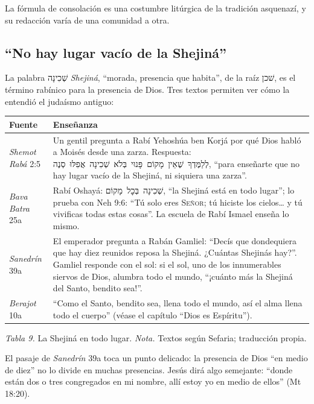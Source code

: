 \documentclass[11pt,letterpaper]{article}
\newcommand{\heb}[1]{\mbox{\foreignlanguage{hebrew}{#1}}}
\newcommand{\SENOR}{\textsc{Señor}}
\begin{document}
\begin{nota}[Precisión]
La fórmula de consolación es una costumbre litúrgica de la tradición asquenazí, y su redacción varía de una comunidad a otra.
\end{nota}

\subsection{``No hay lugar vacío de la Shejiná''}

La palabra \heb{שְׁכִינָה} \emph{Shejiná}, ``morada, presencia que habita'', de la raíz \heb{שׁכן}, es el término rabínico para la presencia de Dios. Tres textos permiten ver cómo la entendió el judaísmo antiguo:

\begin{center}\small\renewcommand{\arraystretch}{1.22}
\begin{tabular}{@{}L{3.0cm}L{11.0cm}@{}}
\toprule
\textbf{Fuente} & \textbf{Enseñanza} \\ \midrule
\emph{Shemot Rabá} 2:5 & Un gentil pregunta a Rabí Yehoshúa ben Korjá por qué Dios habló a Moisés desde una zarza. Respuesta: \heb{לְלַמֶּדְךָ שֶׁאֵין מָקוֹם פָּנוּי בְּלֹא שְׁכִינָה אֲפִלּוּ סְנֶה}, ``para enseñarte que no hay lugar vacío de la Shejiná, ni siquiera una zarza''. \\
\emph{Bava Batra} 25a & Rabí Oshayá: \heb{שְׁכִינָה בְּכׇל מָקוֹם}, ``la Shejiná está en todo lugar''; lo prueba con Neh 9:6: ``Tú solo eres \SENOR{}; tú hiciste los cielos\ldots{} y tú vivificas todas estas cosas''. La escuela de Rabí Ismael enseña lo mismo. \\
\emph{Sanedrín} 39a & El emperador pregunta a Rabán Gamliel: ``Decís que dondequiera que hay diez reunidos reposa la Shejiná. ¿Cuántas Shejinás hay?''. Gamliel responde con el sol: si el sol, uno de los innumerables siervos de Dios, alumbra todo el mundo, ``¡cuánto más la Shejiná del Santo, bendito sea!''. \\
\emph{Berajot} 10a & ``Como el Santo, bendito sea, llena todo el mundo, así el alma llena todo el cuerpo'' (véase el capítulo ``Dios es Espíritu''). \\
\bottomrule
\end{tabular}\par
{\footnotesize\color{gris}\textit{Tabla 9.} La Shejiná en todo lugar. \textit{Nota.} Textos según Sefaria; traducción propia.}
\end{center}

El pasaje de \emph{Sanedrín} 39a toca un punto delicado: la presencia de Dios ``en medio de diez'' no lo divide en muchas presencias. Jesús dirá algo semejante: ``donde están dos o tres congregados en mi nombre, allí estoy yo en medio de ellos'' (Mt 18:20).
\end{document}
